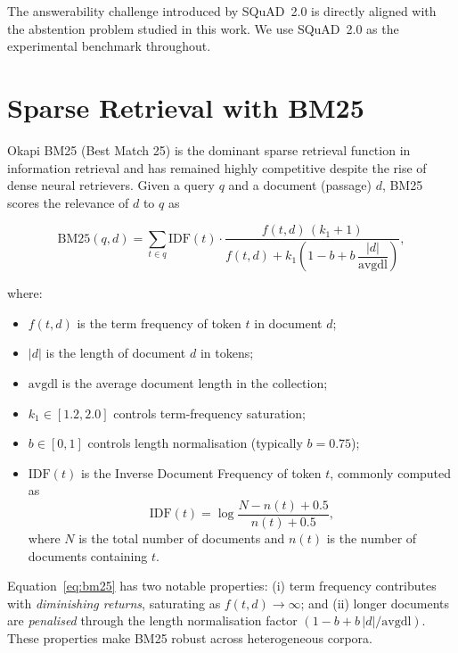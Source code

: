 The answerability challenge introduced by SQuAD~2.0 is directly aligned with
the abstention problem studied in this work. We use SQuAD~2.0 as the
experimental benchmark throughout.

\section{Sparse Retrieval with BM25}
\label{sec:bg_bm25}

Okapi BM25 (Best Match 25) \cite{robertson2009bm25} is the dominant sparse
retrieval function in information retrieval and has remained highly competitive
despite the rise of dense neural retrievers. Given a query $q$ and a document
(passage) $d$, BM25 scores the relevance of $d$ to $q$ as

\begin{equation}
  \text{BM25}(q, d) = \sum_{t \in q} \text{IDF}(t) \cdot
  \frac{f(t, d)\,(k_1 + 1)}
       {f(t, d) + k_1\!\left(1 - b + b\,\dfrac{|d|}{\text{avgdl}}\right)},
  \label{eq:bm25}
\end{equation}

\noindent where:

\begin{itemize}
  \item $f(t, d)$ is the term frequency of token $t$ in document $d$;
  \item $|d|$ is the length of document $d$ in tokens;
  \item $\text{avgdl}$ is the average document length in the collection;
  \item $k_1 \in [1.2, 2.0]$ controls term-frequency saturation;
  \item $b \in [0, 1]$ controls length normalisation (typically $b = 0.75$);
  \item $\text{IDF}(t)$ is the Inverse Document Frequency of token $t$,
        commonly computed as
        \[
          \text{IDF}(t) = \log\!\frac{N - n(t) + 0.5}{n(t) + 0.5},
        \]
        where $N$ is the total number of documents and $n(t)$ is the number of
        documents containing $t$.
\end{itemize}

Equation~\eqref{eq:bm25} has two notable properties: (i) term frequency
contributes with \emph{diminishing returns}, saturating as $f(t,d) \to \infty$;
and (ii) longer documents are \emph{penalised} through the length normalisation
factor $(1 - b + b\,|d|/\text{avgdl})$. These properties make BM25 robust
across heterogeneous corpora.

